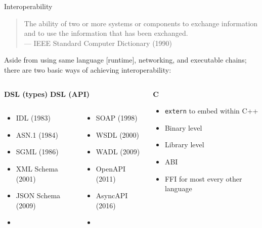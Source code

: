 \documentclass[aspectratio=169,xcolor=dvipsnames]{beamer}
\begin{document}
\begin{frame}{Interoperability}
	\begin{quote}
		The ability of two or more systems or components to exchange information and to use the information that has been exchanged.
		\\{\normalfont --- IEEE Standard Computer Dictionary (1990)}
	\end{quote}

	Aside from using same language [runtime], networking, and executable chains; there are two basic ways of achieving interoperability:
	\vspace{1em}
	\begin{columns}[t]
		\begin{column}[T]{0.4\textwidth}
			\textbf{DSL (types)}\hskip 1.705cm \textbf{DSL (API)}\\
			\begin{columns}[t]
				\begin{column}[T]{0.807\textwidth}
					\begin{itemize}
						\item IDL (1983)
						\item ASN.1 (1984)
						\item SGML (1986)
						\item XML Schema (2001)
						\item JSON Schema (2009)
						\item \textellipsis{}
					\end{itemize}
				\end{column}
				\begin{column}[T]{0.7\textwidth}
					\begin{itemize}
						\item SOAP (1998)
						\item WSDL (2000)
						\item WADL (2009)
						\item OpenAPI (2011)
						\item AsyncAPI (2016)
						\item \textellipsis{}
					\end{itemize}
				\end{column}
			\end{columns}
		\end{column}
		\begin{column}[T]{0.4\textwidth}
			\hskip 1cm \textbf{C}\\
			\begin{itemize}
				\item \texttt{extern} to embed within C++
				\item Binary level
				\item Library level
				\item ABI
				\item FFI for most every other language
			\end{itemize}
		\end{column}
	\end{columns}
\end{frame}
\end{document}

